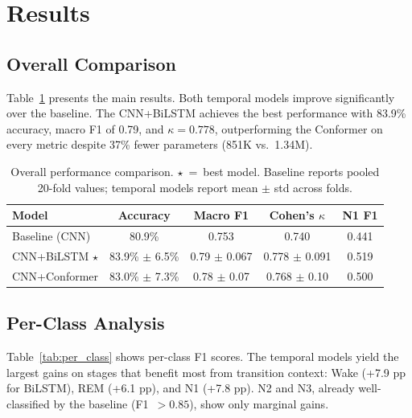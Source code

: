 \documentclass[final]{article}
\begin{document}
\section{Results}

\subsection{Overall Comparison}

Table~\ref{tab:main_results} presents the main results. Both temporal models improve significantly over the baseline. The CNN+BiLSTM achieves the best performance with 83.9\% accuracy, macro F1 of 0.79, and $\kappa = 0.778$, outperforming the Conformer on every metric despite 37\% fewer parameters (851K vs.\ 1.34M).

\begin{table}[t]
\caption{Overall performance comparison. $\star$~=~best model. Baseline reports pooled 20-fold values; temporal models report mean $\pm$ std across folds.}
\label{tab:main_results}
\centering
\small
\begin{tabular}{lcccc}
\toprule
\textbf{Model} & \textbf{Accuracy} & \textbf{Macro F1} & \textbf{Cohen's $\kappa$} & \textbf{N1 F1} \\
\midrule
Baseline (CNN)           & 80.9\%                  & 0.753              & 0.740               & 0.441 \\
CNN+BiLSTM $\star$       & 83.9\% $\pm$ 6.5\%     & 0.79 $\pm$ 0.067   & 0.778 $\pm$ 0.091   & 0.519 \\
CNN+Conformer            & 83.0\% $\pm$ 7.3\%     & 0.78 $\pm$ 0.07    & 0.768 $\pm$ 0.10    & 0.500 \\
\bottomrule
\end{tabular}
\end{table}

\subsection{Per-Class Analysis}

Table~\ref{tab:per_class} shows per-class F1 scores. The temporal models yield the largest gains on stages that benefit most from transition context: Wake (+7.9 pp for BiLSTM), REM (+6.1 pp), and N1 (+7.8 pp). N2 and N3, already well-classified by the baseline (F1~$> 0.85$), show only marginal gains.
\end{document}
